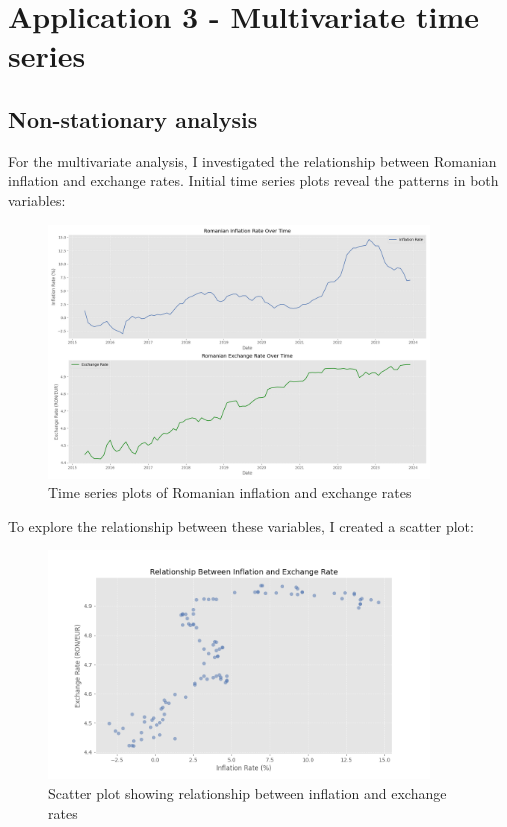 \documentclass[11pt,a4paper]{article}
\begin{document}
\section{Application 3 - Multivariate time series}

\subsection{Non-stationary analysis}

For the multivariate analysis, I investigated the relationship between Romanian inflation and exchange rates. Initial time series plots reveal the patterns in both variables:

\begin{figure}[H]
    \centering
    \includegraphics[width=0.9\textwidth]{plots/multivariate/time_series_plots.png}
    \caption{Time series plots of Romanian inflation and exchange rates}
    \label{fig:multi_series}
\end{figure}

To explore the relationship between these variables, I created a scatter plot:

\begin{figure}[H]
    \centering
    \includegraphics[width=0.9\textwidth]{plots/multivariate/scatter_relationship.png}
    \caption{Scatter plot showing relationship between inflation and exchange rates}
    \label{fig:scatter}
\end{figure}
\end{document}

